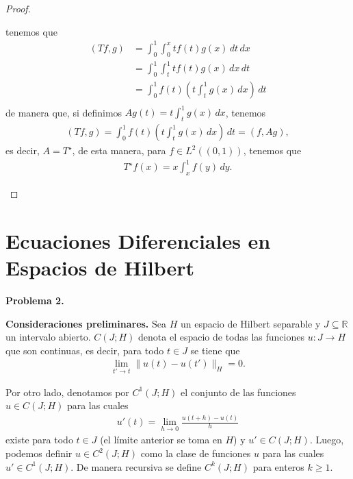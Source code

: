 \begin{proof}
\begin{enumerate}
\begin{center}

        \end{center}
        tenemos que 
        \begin{align*}
            (Tf,g)&=\int_0^1\int_0^x tf(t)g(x)\,  dt\, dx\\
            &=\int_0^1\int_{t}^1 tf(t)g(x)\, dx\, dt\\
            &=\int_0^1 f(t)\left(t\int_t^1g(x)\, dx\right)\, dt\\
        \end{align*}
        de manera que, si definimos $\displaystyle Ag(t)=t\int_t^1g(x)\, dx$, tenemos
        \begin{align*}
            (Tf,g)=\int_0^1 f(t)\left(t\int_t^1g(x)\, dx\right)\, dt=(f,Ag),
        \end{align*}
        es decir, $A=T^\star$, de esta manera, para $f \in L^2((0,1))$, tenemos que 
        \begin{align*}
            T^\star f(x)=x\int_x^1 f(y)\, dy.
        \end{align*}
    \end{enumerate}
\end{proof}

\section{Ecuaciones Diferenciales en Espacios de Hilbert}
\textbf{Problema 2.}

\textbf{Consideraciones preliminares.} Sea $H$ un espacio de Hilbert separable y $J \subseteq \mathbb{R}$ un intervalo abierto. $C(J;H)$ denota el espacio de todas las funciones $u : J \to H$ que son continuas, es decir, para todo $t \in J$ se tiene que
\begin{align*}
  \lim_{t' \to t} \|u(t) - u(t')\|_H = 0.
\end{align*}

Por otro lado, denotamos por $C^1(J;H)$ el conjunto de las funciones $u \in C(J;H)$ para las cuales
\begin{align*}
  u'(t) = \lim_{h \to 0} \frac{u(t+h) - u(t)}{h}
\end{align*}
existe para todo $t \in J$ (el límite anterior se toma en $H$) y $u' \in C(J;H)$. Luego, podemos definir $u \in C^2(J;H)$ como la clase de funciones $u$ para las cuales $u' \in C^1(J;H)$. De manera recursiva se define $C^k(J;H)$ para enteros $k \geq 1$.

